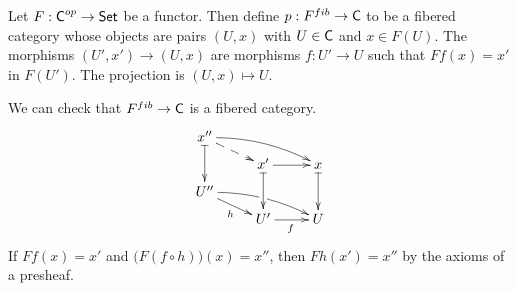 
 \begin{definition}\label{lec22D:F^fib}
   Let $F:\text{\sf C}^{op}\to \text{\sf Set}$ be a functor. Then define $p:F^{fib}\to \text{\sf C}$ to be a fibered
   category whose objects are pairs $(U,x)$ with $U\in \text{\sf C}$ and $x\in F(U)$. The morphisms
   $(U',x')\to (U,x)$ are morphisms $f:U'\to U$ such that $Ff(x)=x'$ in $F(U')$. The
   projection is $(U,x)\mapsto U$.
 \end{definition}
 We can check that $F^{fib}\to \text{\sf C}$ is a fibered category.
   \[\xymatrix@R-1.5pc{
    x'' \ar@{|->}[dd]\ar@{-->}[dr] \ar@/^/[rrd]\\
     & x'\ar@{|->}[dd] \ar[r] & x \ar@{|->}[dd]\\
    U'' \ar[dr]_h \ar@/^/[rrd]|!{[ru];[rd]}\hole \\
    & U' \ar[r]_{f} & U
   }\]
 If $F f(x)=x'$ and $\bigl(F (f\circ h))(x)=x''$, then $F h(x')=x''$ by the axioms of a
 presheaf.

